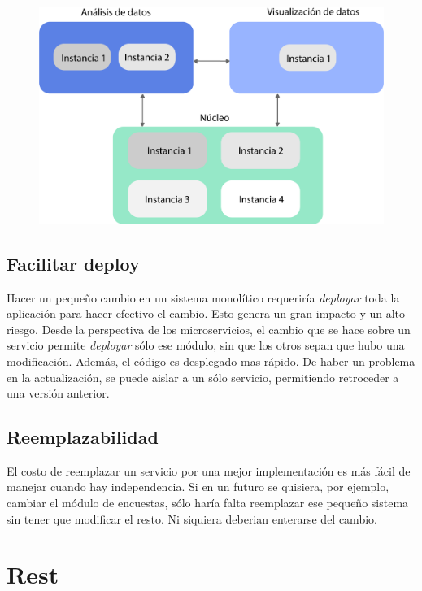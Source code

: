 \begin{figure}[h!]
  \centering
    \includegraphics[scale=0.7]{images/escalamiento.png}
  \label{fig:microescala}
\end{figure}

\subsection[Facilitar deploy]{Facilitar deploy}

Hacer un pequeño cambio en un sistema monolítico requeriría \textit{deployar} toda la aplicación para hacer efectivo el cambio. Esto genera un gran impacto y un alto riesgo. 
Desde la perspectiva de los microservicios, el cambio que se hace sobre un servicio permite \textit{deployar} sólo ese módulo, sin que los otros sepan que hubo una modificación. Además, el código es desplegado mas rápido. 
De haber un problema en la actualización, se puede aislar a un sólo servicio, permitiendo retroceder a una versión anterior.

\subsection[Reemplazabilidad]{Reemplazabilidad}

El costo de reemplazar un servicio por una mejor implementación es más fácil de manejar cuando hay independencia. 
Si en un futuro se quisiera, por ejemplo, cambiar el módulo de encuestas, sólo haría falta reemplazar ese pequeño sistema sin tener que modificar el resto. Ni siquiera deberian enterarse del cambio.

\section[REST]{Rest}

